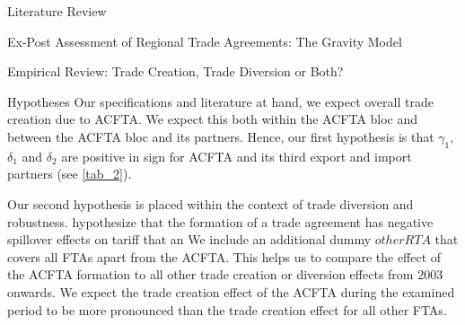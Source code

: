 \begin{section}{Literature Review}
\begin{subsection}{Ex-Post Assessment of Regional Trade Agreements: The Gravity Model}
\begin{subsubsection}{Empirical Review: Trade Creation, Trade Diversion or Both?}
\end{subsubsection}

\end{subsection}

\begin{subsubsection}{Hypotheses}
Our specifications and literature at hand, we expect overall trade creation due to ACFTA. We expect this both within the ACFTA bloc and between the ACFTA bloc and its partners. Hence, our first hypothesis is that $\gamma_1$, $\delta_1$ and $\delta_2$ are positive in sign for ACFTA and its third export and import partners (see \autoref{tab_2}).

Our second hypothesis is placed within the context of trade diversion and robustness. \cite{ksy2018} hypothesize that the formation of a trade agreement has negative spillover effects on tariff that an We include an additional dummy $otherRTA$ that covers all FTAs apart from the ACFTA. This helps us to compare the effect of the ACFTA formation to all other trade creation or diversion effects from 2003 onwards. We expect the trade creation effect of the ACFTA during the examined period to be more pronounced than the trade creation effect for all other FTAs.
\end{subsubsection}


\end{section}
